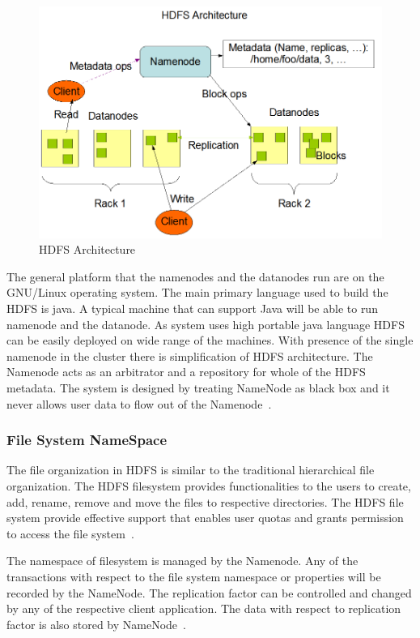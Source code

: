 \begin{figure}[!ht]
\centering\includegraphics[width=\textwidth]{images/HDFSarchi.png}
\caption{HDFS 
Architecture~\cite{hid-sp18-412-HDFS-Architecture}}\label{s:archihdfs}
\end{figure}

The general platform that the namenodes and the datanodes run are on 
the GNU/Linux operating system. The main primary language used to 
build the HDFS is java. A typical machine that can support  
Java will be able to run namenode and the datanode. As  
system uses high portable java language HDFS can be 
easily deployed on wide range of the machines. With  
presence of the single namenode in the cluster there is simplification 
of HDFS architecture. The Namenode acts as an arbitrator 
and a repository for whole of the HDFS metadata. 
The system is designed by treating NameNode as 
black box and it never allows user 
data to flow out of the Namenode~\cite{hid-sp18-412-HDFS-Architecture}.

\subsubsection{File System NameSpace}
The file organization in HDFS is similar to the 
traditional hierarchical file organization. The HDFS 
filesystem provides functionalities to the users to create, 
add, rename, remove and move the files to respective directories. 
The HDFS file system provide effective support that 
enables user quotas and grants  
permission to access the file system~\cite{hid-sp18-412-HDFS-Architecture}. 

The namespace of filesystem is managed by the Namenode. 
Any of the transactions with respect to the file system 
namespace or properties will be recorded by the NameNode. 
The replication factor can be controlled and changed by 
any of the respective client application. The data with 
respect to 
replication factor is also
stored by NameNode~\cite{hid-sp18-412-HDFS-Architecture}.

